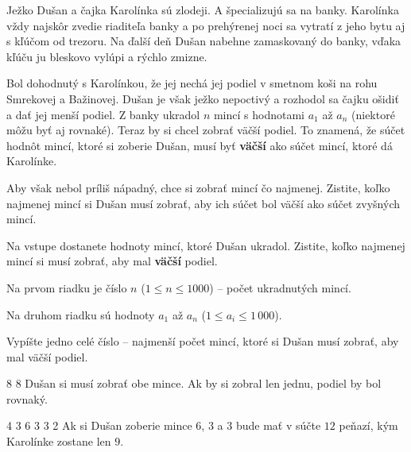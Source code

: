 




Ježko Dušan a čajka Karolínka sú zlodeji. A špecializujú sa na banky. Karolínka
vždy najskôr zvedie riaditeľa banky a po prehýrenej noci sa vytratí z jeho bytu
aj s kľúčom od trezoru. Na ďalší deň Dušan nabehne zamaskovaný do banky, vďaka
kľúču ju bleskovo vylúpi a rýchlo zmizne.

Bol dohodnutý s Karolínkou, že jej nechá jej podiel v smetnom koši na rohu
Smrekovej a Bažinovej.  Dušan je však ježko nepoctivý a rozhodol sa čajku
ošidiť a dať jej menší podiel. Z banky ukradol $n$ mincí s hodnotami $a_1$ až
$a_n$ (niektoré môžu byť aj rovnaké). Teraz by si chcel zobrať väčší podiel.
To znamená, že súčet hodnôt mincí, ktoré si zoberie Dušan, musí byť
\textbf{väčší} ako súčet mincí, ktoré dá Karolínke.

Aby však nebol príliš nápadný, chce si zobrať mincí čo najmenej. Zistite, koľko
najmenej mincí si Dušan musí zobrať, aby ich súčet bol väčší ako súčet zvyšných
mincí.


Na vstupe dostanete hodnoty mincí, ktoré Dušan ukradol. Zistite, koľko najmenej
mincí si musí zobrať, aby mal \textbf{väčší} podiel.


Na prvom riadku je číslo $n$ ($1 \leq n \leq 1000$) -- počet ukradnutých mincí.

Na druhom riadku sú hodnoty $a_1$ až $a_n$ ($1 \leq a_i \leq 1\,000$).


Vypíšte jedno celé číslo -- najmenší počet mincí, ktoré si Dušan musí zobrať,
aby mal väčší podiel.


8 8
\komentar
Dušan si musí zobrať obe mince. Ak by si zobral len jednu, podiel by bol
rovnaký.
\koniec

4 3 6 3 3 2
\komentar
Ak si Dušan zoberie mince $6$, $3$ a $3$ bude mať v súčte $12$ peňazí, kým
Karolínke zostane len $9$.
\koniec


